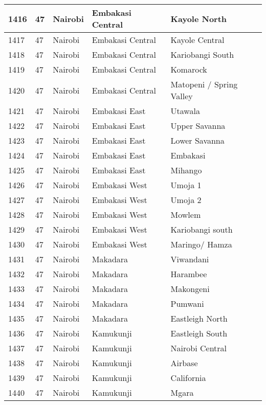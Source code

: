 \begin{table}[!ht]
\begin{tabular}{|l|l|l|l|l|}
        1416 & 47 & Nairobi & Embakasi Central & Kayole North \\ \hline
        1417 & 47 & Nairobi & Embakasi Central & Kayole Central \\ \hline
        1418 & 47 & Nairobi & Embakasi Central & Kariobangi South \\ \hline
        1419 & 47 & Nairobi & Embakasi Central & Komarock \\ \hline
        1420 & 47 & Nairobi & Embakasi Central & Matopeni / Spring Valley \\ \hline
        1421 & 47 & Nairobi & Embakasi East & Utawala \\ \hline
        1422 & 47 & Nairobi & Embakasi East & Upper Savanna \\ \hline
        1423 & 47 & Nairobi & Embakasi East & Lower Savanna \\ \hline
        1424 & 47 & Nairobi & Embakasi East & Embakasi \\ \hline
        1425 & 47 & Nairobi & Embakasi East & Mihango \\ \hline
        1426 & 47 & Nairobi & Embakasi West & Umoja 1 \\ \hline
        1427 & 47 & Nairobi & Embakasi West & Umoja 2 \\ \hline
        1428 & 47 & Nairobi & Embakasi West & Mowlem \\ \hline
        1429 & 47 & Nairobi & Embakasi West & Kariobangi south \\ \hline
        1430 & 47 & Nairobi & Embakasi West & Maringo/ Hamza \\ \hline
        1431 & 47 & Nairobi & Makadara & Viwandani \\ \hline
        1432 & 47 & Nairobi & Makadara & Harambee \\ \hline
        1433 & 47 & Nairobi & Makadara & Makongeni \\ \hline
        1434 & 47 & Nairobi & Makadara & Pumwani \\ \hline
        1435 & 47 & Nairobi & Makadara & Eastleigh North \\ \hline
        1436 & 47 & Nairobi & Kamukunji & Eastleigh South \\ \hline
        1437 & 47 & Nairobi & Kamukunji & Nairobi Central \\ \hline
        1438 & 47 & Nairobi & Kamukunji & Airbase \\ \hline
        1439 & 47 & Nairobi & Kamukunji & California \\ \hline
        1440 & 47 & Nairobi & Kamukunji & Mgara \\ \hline

\end{tabular}
\end{table}
